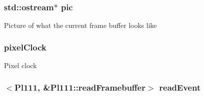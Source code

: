 \label{classPl111_a2c2dac95ed9aeb35e4a37ebdafc357e2}
\hypertarget{classPl111_a188d5098048b3b3a6fd44a4ecd56c797}{
\subsubsection[{pcdlo}]{}}
\label{classPl111_a188d5098048b3b3a6fd44a4ecd56c797}
\hypertarget{classPl111_af724472dcdfb49ce72ef865c101a1c0d}{
\subsubsection[{pic}]{\setlength{\rightskip}{0pt plus 5cm}std::ostream$\ast$ {\bf pic}}}
\label{classPl111_af724472dcdfb49ce72ef865c101a1c0d}
Picture of what the current frame buffer looks like \hypertarget{classPl111_a417073569da6863481ba6470ffc11857}{
\subsubsection[{pixelClock}]{ {\bf pixelClock}}}
\label{classPl111_a417073569da6863481ba6470ffc11857}
Pixel clock \hypertarget{classPl111_ab221ac2ac5d05273785494a20f07491a}{
\subsubsection[{ppl}]{}}
\label{classPl111_ab221ac2ac5d05273785494a20f07491a}
\hypertarget{classPl111_a48f76313a745a16ffbdc95fbc4dfebf2}{
\subsubsection[{readEvent}]{$<${\bf Pl111}, \&Pl111::readFramebuffer$>$ {\bf readEvent}}}
